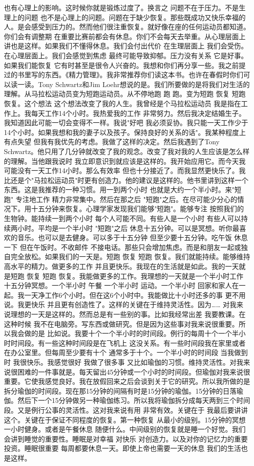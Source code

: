 也有心理上的影响。这时候你就是锻炼过度了。换言之 问题不在于压力。不是生理上的问题 也不是心理上的问题。问题在于缺少恢复。那些既成功又快乐幸福的人。是会感受到压力的。然而他们很注重恢复。就好像在座的任何运动员都知道。你们会有调整期 在重要比赛前都会有休息。你们不会每天去举重。从心理层面上讲也是这样。如果我们不懂得休息。我们会付出代价 在生理层面上 我们会受伤。在心理层面上。我们会感觉到焦虑 最终可能导致抑郁。压力没有关系 它是好事。如果我们能恢复 它有时甚至是很令人兴奋的。我想和你们再分享一些。我之前提过的书里写的东西。《精力管理》。我非常推荐你们读这本书。也许在春假时你们可以读一读。Tony Schwartz和Jim Loehr想说的是。我们所要做的是将我们对生活的理解。从马拉松运动员变为短跑运动员。从不停地跑 跑 跑。变为短跑 恢复 短跑 恢复。这个想法 这个想法改变了我的人生。我曾经是个马拉松运动员 我是指在工作上。我每天工作14个小时。我热爱我的工作 非常努力。然后我决定结婚生子。我知道因此可能一切会变得不一样。我说"好吧 我必须妥协。我只能一天工作少于14个小时。如果我想和我的妻子以及孩子。保持良好的关系的话"。我某种程度上有点失望 但我有我优先的考虑。我做了这样的决定。然后我遇到了Tony Schwartz。他只用了几分钟就改变了我的观念。改变了我对我的人生应该是怎么样的理解。当他跟我说时 我立即意识到就应该是这样的。我开始应用它。而今天我可能没有一天工作14小时。那么有效率 但也十分接近了。而我显然更快乐了。我比还是个"马拉松运动员"时更有创造力。他的建议是这样的。他书里讲到这样一个东西。这是我推荐的一种习惯。用一到两个小时 也就是大约一个半小时。来"短跑" 专注地工作 精力非常集中。然后在那之后 "短跑"之后。在尽可能少分心的情况下。用十五分钟来恢复。心理学家发现我们能够"短跑"。能够专注 按照我们的生物钟。能持续一到两个小时 每个人可能不同。有些人是一个小时 有些人可以持续两小时。平均是一个半小时 "短跑"之后 休息十五分钟。可以是冥想。听你最喜欢的音乐。也可以是去健身。可以多于十五分钟 但至少要十五分钟。吃午饭 休息一下 但在午饭时。不收邮件 不接电话。那些只会增加焦虑。而是和朋友一起或独自完全放松。如果我们的一天是。短跑 恢复 短跑 恢复。我们就能持续。能够维持高水平的精力。做更多的工作 并且更快乐。我现在的生活就是如此。我的一天就是短跑 恢复 短跑 恢复。我能做更多的工作。我理想的一天就是一个半小时工作 十五分钟冥想。一个半小时 午餐 一个半小时 运动。一个半小时 回家和家人在一起。我一天净工作6个小时。但在这6个小时中。我能做比十小时还多的事 更不用说。我更快乐 并且更有创造性了。这样的关键在于维持灵活性。因为…… 对我来说理想的一天是这样的。然而总是有一些别的事。比如我经常出差 我要教课。在这种时候 我不在电脑旁。写东西或做研究。但是因为这些事对我来说很重要。所以我会做的是 比如说。我要十个一个半小时的时间段。例行的每周十个一个半小时时间段。有一些这种时间段是在飞机上 这没关系。有一些时间段我在家里或者在办公室里。但每周至少要有十个 通常多于十个。一个半小时的时间段 当我做到时 我很快乐。我感觉很好 我做了很多事 又比如瑜伽的习惯。维持灵活性。对我来说很困难的一件事就是。每天留出45分钟或一个小时的时间段。但瑜伽对我来说很重要。它使我感觉良好。我在放假回来之后会谈到关于它的研究。所以我所做的是 拆分瑜伽的时间段。现在那15分钟的间隔有时是15分钟的瑜伽。15分钟的日落瑜伽。然后下一个15分钟做另一种瑜伽练习。所以我将瑜伽拆分成每天两到三个时间段。又是例行公事的灵活性。这对我来说有用 非常有效。关键在于 我最后要讲讲这个。关键在于保证不同程度的恢复。第一种恢复 从最小的级别。15分钟的冥想 一小时健身。或者是午餐休息 随便什么。中间级别的恢复就是睡一个好觉。我们会讲到睡觉的重要性。睡眠是对幸福 对快乐 对创造力。以及对你的记忆力的重要投资。睡眠很重要 每周都要休息一天。即使上帝也需要一天的休息 我们的生活也是这样。 
